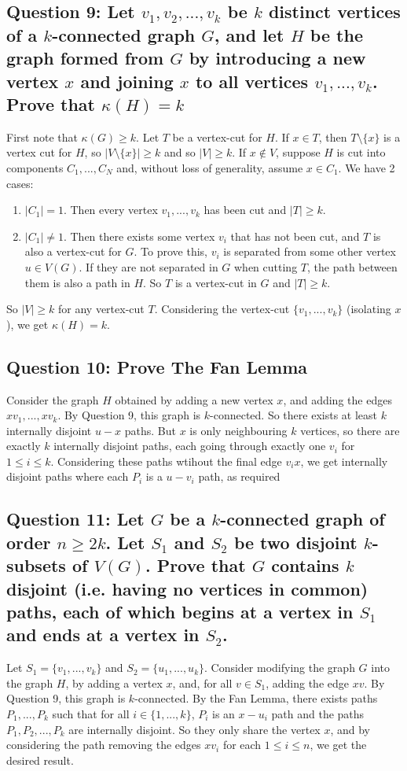\documentclass[letterpaper, 11pt]{article}
\newcommand{\1}{\mathds{1}}	%
\theoremstyle{definition}
\begin{document}
\subsection*{Question 9: Let $v_1, v_2, ..., v_k$ be $k$ distinct vertices of a $k$-connected graph $G$, and let $H$ be the graph formed from $G$ by introducing a new vertex $x$ and joining $x$ to all vertices $v_1, ..., v_k$. Prove that $\kappa (H) = k$} 
First note that $\kappa (G) \ge k$. Let $T$ be a vertex-cut for $H$. If $x\in T$, then $T \setminus \{x\}$ is a vertex cut for $H $, so $|V \setminus \{x\}| \ge k$ and so $|V| \ge k$. If $x \not \in V$, suppose $H$ is cut into components $C_1, ..., C_N$ and, without loss of generality, assume $x \in C_1$. We have 2 cases: 
\begin{enumerate}
	\item $|C_1| = 1$. Then every vertex $v_1, ..., v_k$ has been cut and $|T| \ge k$.
	\item $|C_1| \ne 1$. Then there exists some vertex $v_i$ that has not been cut, and $T$ is also a vertex-cut for $G$. To prove this,  $v_i$ is separated from some other vertex $u \in V(G)$. If they are not separated in $G$ when cutting $T$, the path between them is also a path in $H$. So $T$ is a vertex-cut in $G$ and $|T| \ge k$.
	\end{enumerate}
So $|V| \ge k$ for any vertex-cut $T$. Considering the vertex-cut $\{v_1, ..., v_k\}$ (isolating $x$), we get $\kappa (H) = k$.

\subsection*{Question 10: Prove The Fan Lemma}

Consider the graph $H$ obtained by adding a new vertex $x$, and adding the edges $xv_1, ..., xv_k$. By Question 9, this graph is $k$-connected. So there exists at least $k$ internally disjoint $u-x$ paths. But $x$ is only neighbouring $k$ vertices, so there are exactly $k$ internally disjoint paths, each going through exactly one $v_i$ for $1 \le i \le k$. Considering these paths wtihout the final edge $v_ix$, we get internally disjoint paths where each $P_i$ is a $u-v_i$ path, as required

\subsection*{Question 11: Let $G$ be a $k$-connected graph of order $n \ge 2k$. Let $S_1$ and $S_2$ be two disjoint $k$-subsets of $V(G)$. Prove that $G$ contains $k$ disjoint (i.e. having no vertices in common) paths, each of which begins at a vertex in $S_1$ and ends at a vertex in $S_2$.}
Let $S_1 = \{v_1, ..., v_k\}$ and $S_2 = \{u_1, ..., u_k\}$. Consider modifying the graph $G$ into the graph $H$, by adding a vertex $x$, and, for all $v \in S_1$, adding the edge $xv$. By Question 9, this graph is $k$-connected. By the Fan Lemma, there exists paths $P_1, ..., P_k$ such that for all $i \in \{1,...,k\}$, $P_i$ is an $x-u_i$ path and the paths $P_1, P_2, ..., P_k$ are internally disjoint. So they only share the vertex $x$, and by considering the path removing the edges $xv_i$ for each $1\le i\le n$, we get the desired result.
\end{document}
